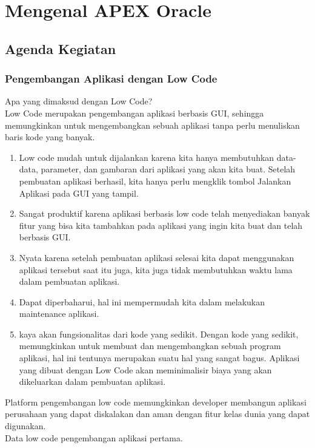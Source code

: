 \chapter{Mengenal APEX Oracle}

\section{Agenda Kegiatan}
\subsection{Pengembangan Aplikasi dengan Low Code}
Apa yang dimaksud dengan Low Code?\\
Low Code merupakan pengembangan aplikasi berbasis GUI, sehingga memungkinkan untuk mengembangkan sebuah aplikasi tanpa perlu menuliskan baris kode yang banyak.\\
\begin{enumerate}
 \item Low code mudah untuk dijalankan karena kita hanya membutuhkan data-data, parameter, dan gambaran dari aplikasi yang akan kita buat. Setelah pembuatan aplikasi berhasil, kita hanya perlu mengklik tombol Jalankan Aplikasi pada GUI yang tampil.
 \item Sangat produktif karena aplikasi berbasis low code telah menyediakan banyak fitur yang bisa kita tambahkan pada aplikasi yang ingin kita buat dan telah berbasis GUI.
 \item Nyata karena setelah pembuatan aplikasi selesai kita dapat  menggunakan aplikasi tersebut saat itu juga, kita juga tidak membutuhkan waktu lama dalam pembuatan aplikasi.
 \item Dapat diperbaharui, hal ini mempermudah kita dalam melakukan maintenance aplikasi.
 \item kaya akan fungsionalitas dari kode yang sedikit. Dengan kode yang sedikit, memungkinkan untuk membuat dan mengembangkan sebuah program aplikasi, hal ini tentunya merupakan suatu hal yang sangat bagus. Aplikasi yang dibuat dengan Low Code akan meminimalisir biaya yang akan dikeluarkan dalam pembuatan aplikasi.
\end{enumerate}
Platform pengembangan low code memungkinkan developer membangun aplikasi perusahaan yang dapat diskalakan dan aman dengan fitur kelas dunia yang dapat digunakan.\\
Data low code pengembangan aplikasi pertama.
